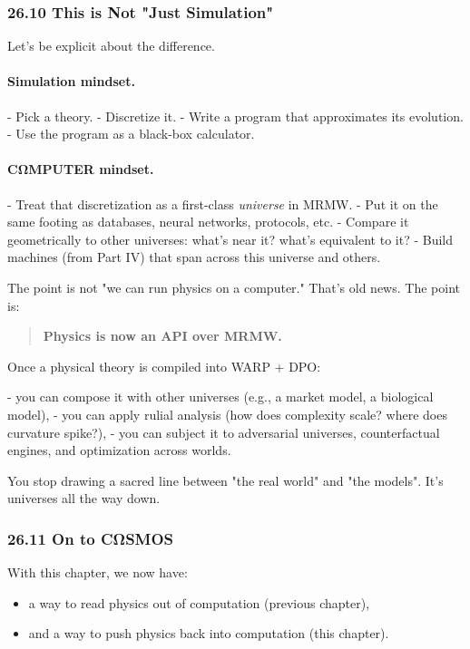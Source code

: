 \subsubsection*{26.10  This is Not "Just Simulation"}

Let’s be explicit about the difference.

\paragraph{Simulation mindset.}

- Pick a theory.
- Discretize it.
- Write a program that approximates its evolution.
- Use the program as a black-box calculator.

\paragraph{CΩMPUTER mindset.}

- Treat that discretization as a first-class \emph{universe} in MRMW.
- Put it on the same footing as databases, neural networks, protocols, etc.
- Compare it geometrically to other universes: what’s near it? what’s equivalent to it?
- Build machines (from Part IV) that span across this universe and others.

The point is not "we can run physics on a computer." That’s old news.
The point is:

\begin{quote}
\textbf{Physics is now an API over MRMW.}
\end{quote}

Once a physical theory is compiled into WARP + DPO:

- you can compose it with other universes (e.g., a market model, a biological model),
- you can apply rulial analysis (how does complexity scale? where does curvature spike?),
- you can subject it to adversarial universes, counterfactual engines, and optimization across worlds.

You stop drawing a sacred line between "the real world" and "the models".
It’s universes all the way down.

\subsubsection*{26.11  On to CΩSMOS}

With this chapter, we now have:

\begin{itemize}
  \item a way to read physics out of computation (previous chapter),
  \item and a way to push physics back into computation (this chapter).
\end{itemize}


